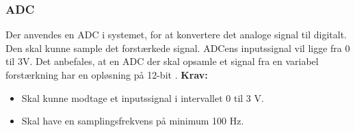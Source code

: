 
%
%

%
%
%
%
%
%
\subsubsection{ADC}
Der anvendes en ADC i systemet, for at konvertere det analoge signal til digitalt. Den skal kunne sample det forstærkede signal. ADCens inputssignal vil ligge fra 0 til 3V. Det anbefales, at en ADC der skal opsamle et signal fra en variabel forstærkning har en opløsning på 12-bit \cite{Zouridakis2003}.
\textbf{Krav:}
\begin{itemize}
\item Skal kunne modtage et inputssignal i intervallet 0 til 3 V.
\item Skal have en samplingsfrekvens på minimum 100 Hz. 
\end{itemize}

